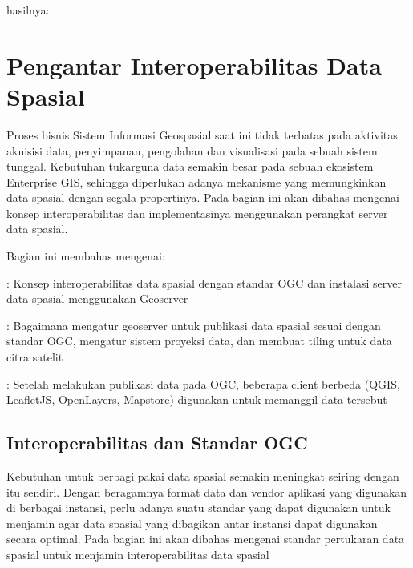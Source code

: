 \documentclass[letterpaper,10pt,english]{sphinxmanual}
\begin{document}
hasilnya:



\chapter{Pengantar Interoperabilitas Data Spasial}
\label{\detokenize{sesi3/introogc:pengantar-interoperabilitas-data-spasial}}\label{\detokenize{sesi3/introogc::doc}}
Proses bisnis Sistem Informasi Geospasial saat ini tidak terbatas pada aktivitas akuisisi data, penyimpanan, pengolahan dan visualisasi pada sebuah sistem tunggal. Kebutuhan tukar\sphinxhyphen{}guna data semakin besar pada sebuah ekosistem Enterprise GIS, sehingga diperlukan adanya mekanisme yang memungkinkan data spasial dengan segala propertinya. Pada bagian ini akan dibahas mengenai konsep interoperabilitas dan implementasinya menggunakan perangkat server data spasial.

Bagian ini membahas mengenai:

 {\hyperref[\detokenize{sesi3/interoperabilitas::doc}]{}}
: Konsep interoperabilitas data spasial dengan standar OGC dan instalasi server data spasial menggunakan Geoserver

 {\hyperref[\detokenize{sesi3/publikasi::doc}]{}}
: Bagaimana mengatur geoserver untuk publikasi data spasial sesuai dengan standar OGC, mengatur sistem proyeksi data, dan membuat tiling untuk data citra satelit

 {\hyperref[\detokenize{sesi3/konsumsiogc::doc}]{}}
: Setelah melakukan publikasi data pada OGC, beberapa client berbeda (QGIS, LeafletJS, OpenLayers, Mapstore) digunakan untuk memanggil data tersebut






\section{Interoperabilitas dan Standar OGC}
\label{\detokenize{sesi3/interoperabilitas:interoperabilitas-dan-standar-ogc}}\label{\detokenize{sesi3/interoperabilitas::doc}}
Kebutuhan untuk berbagi pakai data spasial semakin meningkat seiring dengan  itu sendiri. Dengan beragamnya format data dan vendor aplikasi yang digunakan di berbagai instansi, perlu adanya suatu standar yang dapat digunakan untuk menjamin agar data spasial yang dibagikan antar instansi dapat digunakan secara optimal. Pada bagian ini akan dibahas mengenai standar pertukaran data spasial untuk menjamin interoperabilitas data spasial
\end{document}
